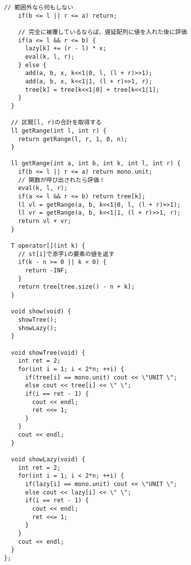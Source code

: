 \documentclass[a4j,titlepage]{jarticle} %
\begin{document}
\begin{lstlisting}[caption=LazySegmentTree]
    // 範囲外なら何もしない
    if(b <= l || r <= a) return;
    
    // 完全に被覆しているならば、遅延配列に値を入れた後に評価
    if(a <= l && r <= b) {
      lazy[k] += (r - l) * x;
      eval(k, l, r);
    } else {
      add(a, b, x, k<<1|0, l, (l + r)>>1);
      add(a, b, x, k<<1|1, (l + r)>>1, r);
      tree[k] = tree[k<<1|0] + tree[k<<1|1];
    }
  }

  // 区間[l, r)の合計を取得する
  ll getRange(int l, int r) {
    return getRange(l, r, 1, 0, n);
  }

  ll getRange(int a, int b, int k, int l, int r) {
    if(b <= l || r <= a) return mono.unit;
    // 関数が呼び出されたら評価！
    eval(k, l, r);
    if(a <= l && r <= b) return tree[k];
    ll vl = getRange(a, b, k<<1|0, l, (l + r)>>1);
    ll vr = getRange(a, b, k<<1|1, (l + r)>>1, r);
    return vl + vr;
  }

  T operator[](int k) {
    // st[i]で添字iの要素の値を返す
    if(k - n >= 0 || k < 0) {
      return -INF;
    }
    return tree[tree.size() - n + k];
  }

  void show(void) {
    showTree();
    showLazy();
  }

  void showTree(void) {
    int ret = 2;
    for(int i = 1; i < 2*n; ++i) {
      if(tree[i] == mono.unit) cout << \"UNIT \";
      else cout << tree[i] << \" \";
      if(i == ret - 1) {
        cout << endl;
        ret <<= 1;
      }
    }
    cout << endl;
  }

  void showLazy(void) {
    int ret = 2;
    for(int i = 1; i < 2*n; ++i) {
      if(lazy[i] == mono.unit) cout << \"UNIT \";
      else cout << lazy[i] << \" \";
      if(i == ret - 1) {
        cout << endl;
        ret <<= 1;
      }
    }
    cout << endl;
  }
};

\end{lstlisting}

\color{white}
\end{document}
